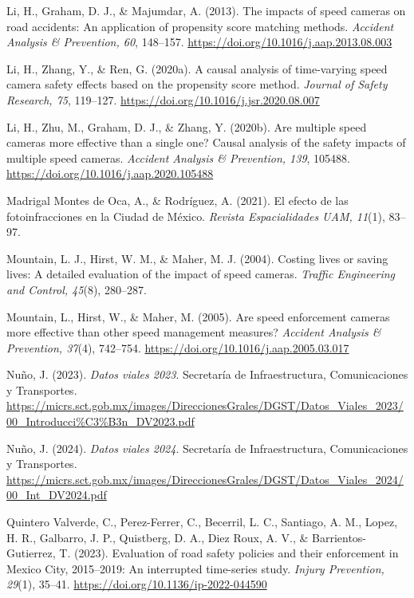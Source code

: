 \begin{thebibliography}{}
Li, H., Graham, D. J., \& Majumdar, A. (2013). The impacts of speed cameras on road accidents: An application of propensity score matching methods. \textit{Accident Analysis \& Prevention, 60}, 148–157. \url{https://doi.org/10.1016/j.aap.2013.08.003}

Li, H., Zhang, Y., \& Ren, G. (2020a). A causal analysis of time-varying speed camera safety effects based on the propensity score method. \textit{Journal of Safety Research, 75}, 119–127. \url{https://doi.org/10.1016/j.jsr.2020.08.007}

Li, H., Zhu, M., Graham, D. J., \& Zhang, Y. (2020b). Are multiple speed cameras more effective than a single one? Causal analysis of the safety impacts of multiple speed cameras. \textit{Accident Analysis \& Prevention, 139}, 105488. \url{https://doi.org/10.1016/j.aap.2020.105488}

Madrigal Montes de Oca, A., \& Rodríguez, A. (2021). El efecto de las fotoinfracciones en la Ciudad de México. \textit{Revista Espacialidades UAM, 11}(1), 83–97.

Mountain, L. J., Hirst, W. M., \& Maher, M. J. (2004). Costing lives or saving lives: A detailed evaluation of the impact of speed cameras. \textit{Traffic Engineering and Control, 45}(8), 280–287.

Mountain, L., Hirst, W., \& Maher, M. (2005). Are speed enforcement cameras more effective than other speed management measures? \textit{Accident Analysis \& Prevention, 37}(4), 742–754. \url{https://doi.org/10.1016/j.aap.2005.03.017}

Nuño, J. (2023). \textit{Datos viales 2023}. Secretaría de Infraestructura, Comunicaciones y Transportes. \url{https://micrs.sct.gob.mx/images/DireccionesGrales/DGST/Datos_Viales_2023/00_Introducci%C3%B3n_DV2023.pdf}

Nuño, J. (2024). \textit{Datos viales 2024}. Secretaría de Infraestructura, Comunicaciones y Transportes. \url{https://micrs.sct.gob.mx/images/DireccionesGrales/DGST/Datos_Viales_2024/00_Int_DV2024.pdf}

Quintero Valverde, C., Perez-Ferrer, C., Becerril, L. C., Santiago, A. M., Lopez, H. R., Galbarro, J. P., Quistberg, D. A., Diez Roux, A. V., \& Barrientos-Gutierrez, T. (2023). Evaluation of road safety policies and their enforcement in Mexico City, 2015–2019: An interrupted time-series study. \textit{Injury Prevention, 29}(1), 35–41. \url{https://doi.org/10.1136/ip-2022-044590}


\end{thebibliography}
